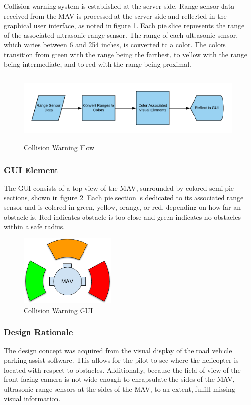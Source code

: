 \documentclass[onecolumn, oneside, letterpaper, draftclsnofoot, 10pt, compsoc]{IEEEtran}
\begin{document}
\noindent
\newline
Collision warning system is established at the server side. Range sensor data received from the MAV is processed at the server side and reflected in the graphical user interface, as noted in figure \ref{fig:ColWar}. Each pie slice represents the range of the associated ultrasonic range sensor. The range of each ultrasonic sensor, which varies between 6 and 254 inches, is converted to a color. The colors transition from green with the range being the farthest, to yellow with the range being intermediate, and to red with the range being proximal.
\begin{figure}[h]
    \centering
    \includegraphics[height=3.5cm]{graphics/collision_warning.png}
    \caption{Collision Warning Flow}
    \label{fig:ColWar}
\end{figure}

\subsubsection{GUI Element}
The GUI consists of a top view of the MAV, surrounded by colored semi-pie sections, shown in figure \ref{fig:ColWarGUI}. Each pie section is dedicated to its associated range sensor and is colored in green, yellow, orange, or red, depending on how far an obstacle is. Red indicates obstacle is too close and green indicates no obstacles within a safe radius.
\begin{figure}[h]
    \centering
    \includegraphics[height=3.5cm]{graphics/collision_warning_gui.png}
    \caption{Collision Warning GUI}
    \label{fig:ColWarGUI}
\end{figure}

\subsubsection{Design Rationale}
The design concept was acquired from the visual display of the road vehicle parking assist software. This allows for the pilot to see where the helicopter is located with respect to obstacles. Additionally, because the field of view of the front facing camera is not wide enough to encapsulate the sides of the MAV, ultrasonic range sensors at the sides of the MAV, to an extent, fulfill missing visual information.
\end{document}
